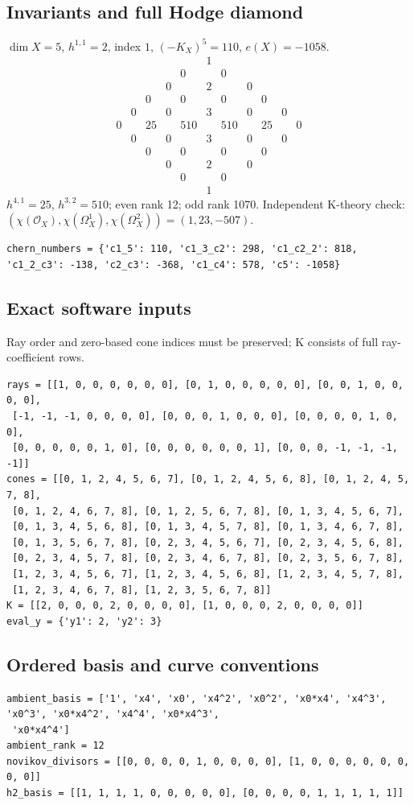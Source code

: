 \documentclass[10pt,a4paper]{article}
\begin{document}
\subsection*{Invariants and full Hodge diamond}
$\dim X=5$, $h^{1,1}=2$, index $1$, $(-K_X)^5=110$, $e(X)=-1058$.
\[\begin{array}{ccccccccccc}&&&&&1&&&&&\\&&&&0&&0&&&&\\&&&0&&2&&0&&&\\&&0&&0&&0&&0&&\\&0&&0&&3&&0&&0&\\0&&25&&510&&510&&25&&0\\&0&&0&&3&&0&&0&\\&&0&&0&&0&&0&&\\&&&0&&2&&0&&&\\&&&&0&&0&&&&\\&&&&&1&&&&&\end{array}\]
$h^{4,1}=25$, $h^{3,2}=510$; even rank 12; odd rank 1070.
Independent K-theory check: $(\chi(\mathcal O_X),\chi(\Omega_X^1),\chi(\Omega_X^2))=(1, 23, -507)$.
\begin{lstlisting}
chern_numbers = {'c1_5': 110, 'c1_3_c2': 298, 'c1_c2_2': 818, 'c1_2_c3': -138, 'c2_c3': -368, 'c1_c4': 578, 'c5': -1058}
\end{lstlisting}
\subsection*{Exact software inputs}
Ray order and zero-based cone indices must be preserved; K consists of full ray-coefficient rows.
\begin{lstlisting}
rays = [[1, 0, 0, 0, 0, 0, 0], [0, 1, 0, 0, 0, 0, 0], [0, 0, 1, 0, 0, 0, 0],
 [-1, -1, -1, 0, 0, 0, 0], [0, 0, 0, 1, 0, 0, 0], [0, 0, 0, 0, 1, 0, 0],
 [0, 0, 0, 0, 0, 1, 0], [0, 0, 0, 0, 0, 0, 1], [0, 0, 0, -1, -1, -1, -1]]
cones = [[0, 1, 2, 4, 5, 6, 7], [0, 1, 2, 4, 5, 6, 8], [0, 1, 2, 4, 5, 7, 8],
 [0, 1, 2, 4, 6, 7, 8], [0, 1, 2, 5, 6, 7, 8], [0, 1, 3, 4, 5, 6, 7],
 [0, 1, 3, 4, 5, 6, 8], [0, 1, 3, 4, 5, 7, 8], [0, 1, 3, 4, 6, 7, 8],
 [0, 1, 3, 5, 6, 7, 8], [0, 2, 3, 4, 5, 6, 7], [0, 2, 3, 4, 5, 6, 8],
 [0, 2, 3, 4, 5, 7, 8], [0, 2, 3, 4, 6, 7, 8], [0, 2, 3, 5, 6, 7, 8],
 [1, 2, 3, 4, 5, 6, 7], [1, 2, 3, 4, 5, 6, 8], [1, 2, 3, 4, 5, 7, 8],
 [1, 2, 3, 4, 6, 7, 8], [1, 2, 3, 5, 6, 7, 8]]
K = [[2, 0, 0, 0, 2, 0, 0, 0, 0], [1, 0, 0, 0, 2, 0, 0, 0, 0]]
eval_y = {'y1': 2, 'y2': 3}
\end{lstlisting}
\subsection*{Ordered basis and curve conventions}
\begin{lstlisting}
ambient_basis = ['1', 'x4', 'x0', 'x4^2', 'x0^2', 'x0*x4', 'x4^3', 'x0^3', 'x0*x4^2', 'x4^4', 'x0*x4^3',
 'x0*x4^4']
ambient_rank = 12
novikov_divisors = [[0, 0, 0, 0, 1, 0, 0, 0, 0], [1, 0, 0, 0, 0, 0, 0, 0, 0]]
h2_basis = [[1, 1, 1, 1, 0, 0, 0, 0, 0], [0, 0, 0, 0, 1, 1, 1, 1, 1]]
\end{lstlisting}
\end{document}
